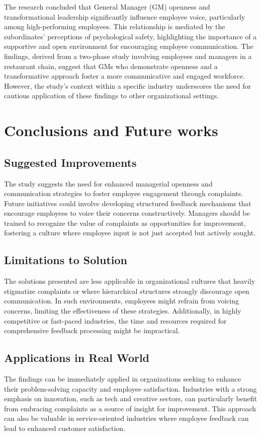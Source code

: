 \documentclass[runningheads]{llncs}
\begin{document}
The research concluded that General Manager (GM) openness and transformational leadership significantly influence employee voice, particularly among high-performing employees. This relationship is mediated by the subordinates' perceptions of psychological safety, highlighting the importance of a supportive and open environment for encouraging employee communication. The findings, derived from a two-phase study involving employees and managers in a restaurant chain, suggest that GMs who demonstrate openness and a transformative approach foster a more communicative and engaged workforce. However, the study's context within a specific industry underscores the need for cautious application of these findings to other organizational settings.

\section{Conclusions and Future works}
\subsection{Suggested Improvements}
The study suggests the need for enhanced managerial openness and communication strategies to foster employee engagement through complaints. Future initiatives could involve developing structured feedback mechanisms that encourage employees to voice their concerns constructively. Managers should be trained to recognize the value of complaints as opportunities for improvement, fostering a culture where employee input is not just accepted but actively sought.
\subsection{Limitations to Solution}
The solutions presented are less applicable in organizational cultures that heavily stigmatize complaints or where hierarchical structures strongly discourage open communication. In such environments, employees might refrain from voicing concerns, limiting the effectiveness of these strategies. Additionally, in highly competitive or fast-paced industries, the time and resources required for comprehensive feedback processing might be impractical.
\subsection{Applications in Real World}
The findings can be immediately applied in organizations seeking to enhance their problem-solving capacity and employee satisfaction. Industries with a strong emphasis on innovation, such as tech and creative sectors, can particularly benefit from embracing complaints as a source of insight for improvement. This approach can also be valuable in service-oriented industries where employee feedback can lead to enhanced customer satisfaction.
\end{document}
